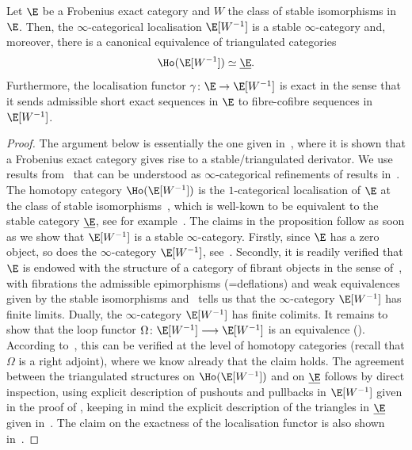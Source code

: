 \documentclass[a4paper]{amsart}
\begin{document}
\begin{proposition}[Cisinski]
  \label{prop:Cisinski-Frobenius-stable-cat}
  Let $\E$ be a Frobenius exact category and $W$ the class of stable
  isomorphisms in $\E$. Then, the $\infty$-categorical localisation $\E[W^{-1}]$
  is a stable $\infty$-category and, moreover, there is a canonical equivalence
  of triangulated categories
  \[
    \Ho(\E[W^{-1}])\simeq\underline{\E}.
  \]
  Furthermore, the localisation functor $\gamma\colon\E\to\E[W^{-1}]$ is exact
  in the sense that it sends admissible short exact sequences in $\E$ to
  fibre-cofibre sequences in $\E[W^{-1}]$.
\end{proposition}
\begin{proof}
  The argument below is essentially the one given
  in~\cite[Proposition~4.19.]{Cis10}, where it is shown that a Frobenius exact
  category gives rise to a stable/triangulated derivator. We use results
  from~\cite[Chapter~7]{Cis19} that can be understood as $\infty$-categorical
  refinements of results in~\cite{Cis10}. The homotopy category
  $\Ho(\E[W^{-1}])$ is the $1$-categorical localisation of $\E$ at the class of
  stable isomorphisms~\cite[Remark~7.1.6]{Cis19}, which is well-kown to be
  equivalent to the stable category $\underline{\E}$, see for
  example~\cite[Lemma~2.2.2]{Kra22}. The claims in the proposition follow as
  soon as we show that $\E[W^{-1}]$ is a stable $\infty$-category. Firstly,
  since $\E$ has a zero object, so does the $\infty$-category $\E[W^{-1}]$,
  see~\cite[Remark~7.1.15]{Cis19}. Secondly, it is readily verified that $\E$ is
  endowed with the structure of a category of fibrant objects in the sense
  of~\cite[Definition~7.5.7]{Cis19}, with fibrations the admissible epimorphisms
  (=deflations) and weak equivalences given by the stable isomorphisms
  and~\cite[Proposition~7.5.6]{Cis19} tells us that the $\infty$-category
  $\E[W^{-1}]$ has finite limits. Dually, the $\infty$-category $\E[W^{-1}]$ has
  finite colimits. It remains to show that the loop functor
  $\Omega\colon\E[W^{-1}]\longrightarrow\E[W^{-1}]$ is an equivalence ().
  According to~\cite[Theorem~7.6.10]{Cis19}, this can
  be verified at the level of homotopy categories (recall that $\Omega$ is a right
  adjoint), where we know already that
  the claim holds. The agreement between the triangulated structures on
  $\Ho(\E[W^{-1}])$ and on $\underline{\E}$ follows by direct inspection, using
  explicit description of pushouts and pullbacks in $\E[W^{-1}]$ given in the
  proof of \cite[Proposition~7.5.6]{Cis19}, keeping in mind the explicit
  description of the triangles in $\underline{\E}$ given
  in~\cite[Theorem~I.2.6]{Hap88}. The claim on the exactness of the localisation
  functor is also shown in~\cite[Proposition~7.5.6]{Cis19}.
\end{proof}
\end{document}
